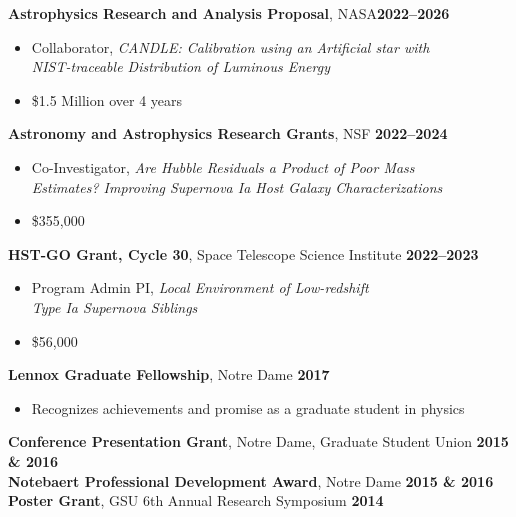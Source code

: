 \documentclass[margin]{res}
\begin{document}
\begin{resume}
\textbf{Astrophysics Research and Analysis Proposal}, NASA\hfill {\bf 2022--2026}
\begin{itemize}  \itemsep -2pt %
     \item[] Collaborator, \textit{CANDLE: Calibration using an Artificial star with\\NIST-traceable Distribution of Luminous Energy}
     \item[] \$1.5 Million over 4 years
    \end{itemize} \vspace{-12pt}
\textbf{Astronomy and Astrophysics Research Grants}, NSF \hfill \textbf{2022--2024}
\begin{itemize}  \itemsep -2pt %
     \item[] Co-Investigator, \textit{Are Hubble Residuals a Product of Poor Mass\\Estimates? Improving Supernova Ia Host Galaxy Characterizations} 
     \item[] \$355,000
    \end{itemize} \vspace{-12pt}
\textbf{HST-GO Grant, Cycle 30}, Space Telescope Science Institute \hfill \textbf{2022--2023}
\begin{itemize}  \itemsep -2pt %
     \item[] Program Admin PI, \textit{Local Environment of Low-redshift \\Type Ia Supernova Siblings} 
     \item[] \$56,000
    \end{itemize} \vspace{-12pt}
{\bf Lennox Graduate Fellowship}, Notre Dame \hfill {\bf 2017}
    \begin{itemize}  \itemsep -2pt %
     \item[] Recognizes achievements and promise as a graduate student in physics
    \end{itemize} \vspace{-12pt}
{\bf Conference Presentation Grant}, Notre Dame, Graduate Student Union  \hfill {\bf 2015 \& 2016}\\
{\bf Notebaert Professional Development Award}, Notre Dame \hfill {\bf 2015 \& 2016}\\
{\bf Poster Grant}, GSU 6th Annual Research Symposium \hfill {\bf 2014}

\end{resume}
\end{document}
